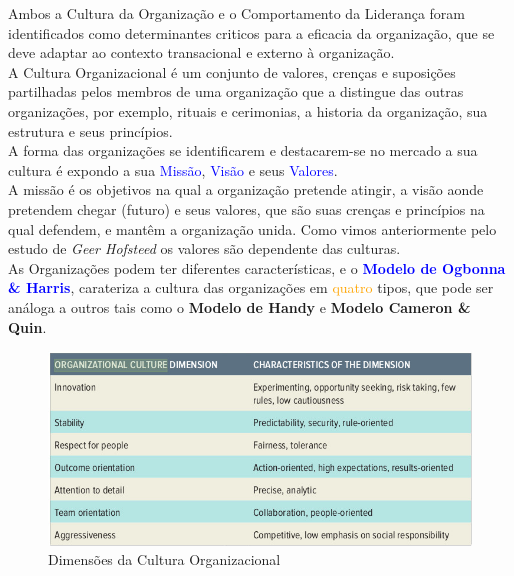 {Ambos a Cultura da Organização e o Comportamento da Liderança foram identificados como determinantes criticos para a eficacia da organização, que se deve adaptar ao contexto transacional e externo à organização.\\

A Cultura Organizacional é um conjunto de valores, crenças e suposições partilhadas pelos membros de uma organização que a distingue das outras organizações, por exemplo, rituais e cerimonias, a historia da organização, sua estrutura e seus princípios.\\

A forma das organizações se identificarem e destacarem-se no mercado a sua cultura é expondo a sua \textcolor{blue}{Missão}, \textcolor{blue}{Visão} e seus \textcolor{blue}{Valores}.\\

A missão é os objetivos na qual a organização pretende atingir, a visão aonde pretendem chegar (futuro) e seus valores, que são suas crenças e princípios na qual defendem, e mantêm a organização unida. Como vimos anteriormente pelo estudo de \textit{Geer Hofsteed} os valores são dependente das culturas.\\

As Organizações podem ter diferentes características, e o \textcolor{blue}{\textbf{Modelo de Ogbonna \& Harris}}, carateriza a cultura das organizações em \textcolor{orange}{quatro} tipos, que pode ser análoga a outros tais como o \textbf{Modelo de Handy} e \textbf{Modelo Cameron \& Quin}.\\
\begin{figure}[H]
\flushleft
\captionsetup{justification=raggedright,singlelinecheck=false}
\includegraphics[scale=0.4]{./image/OB/OC_Dimensions.jpg}
\caption{Dimensões da Cultura Organizacional}
\end{figure}







}
